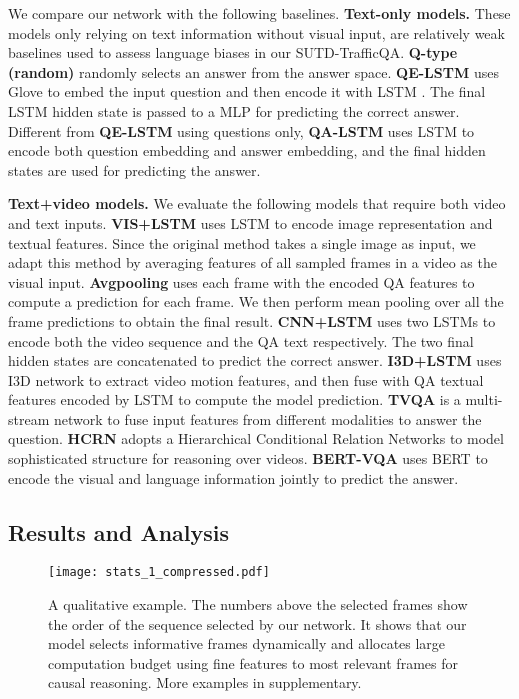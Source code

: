\documentclass[final]{cvpr}
\begin{document}
We compare our network with the following baselines.
{\bf Text-only models.} These models only relying on text information without visual input, are relatively weak baselines used to assess language biases in our SUTD-TrafficQA. {\bf Q-type (random)} randomly selects an answer from the answer space. {\bf QE-LSTM} uses Glove \cite{Pennington14glove:global} to embed the input question and then encode it with LSTM \cite{hochreiter1997long}. The final LSTM hidden state is passed to a MLP for predicting the correct answer. Different from {\bf QE-LSTM} using questions only, {\bf QA-LSTM} uses LSTM to encode both question embedding and answer embedding, and the final hidden states are used for predicting the answer.

{\bf Text+video models.} We evaluate the following models that require both video and text inputs. 
{\bf VIS+LSTM} \cite{ren2015exploring} uses LSTM to encode image representation and textual features. Since the original method takes a single image as input, we adapt this method by averaging features of all sampled frames in a video as the visual input. 
{\bf Avgpooling} uses each frame with the encoded QA features to compute a prediction for each frame.
We then perform mean pooling over all the frame predictions to obtain the final result. 
{\bf CNN+LSTM} uses two LSTMs to encode both the video sequence and the QA text respectively. The two final hidden states are concatenated to predict the correct answer.
{\bf I3D+LSTM} uses I3D network \cite{carreira2017quo} to extract video motion features, and then fuse with QA textual features encoded by LSTM to compute the model prediction.
{\bf TVQA} \cite{lei2018tvqa} is a multi-stream network to fuse input features from different modalities to answer the question. 
{\bf HCRN} \cite{Le_2020_CVPR} adopts a Hierarchical Conditional Relation Networks to model sophisticated structure for reasoning over videos.
{\bf BERT-VQA} \cite{Yang_2020_WACV} uses BERT \cite{devlin2018bert} 
to encode the visual and language information jointly to predict the answer. 
{\bf }




\subsection{Results and Analysis}

\begin{figure*}[t]
\setlength\abovecaptionskip{-5cm}
\setlength\belowcaptionskip{-5cm}
\begin{center}
    \texttt{[image: stats\_1\_compressed.pdf]}
\end{center}
\vspace{-0.3cm}
    \caption{A qualitative example. The numbers above the selected frames show the order of the sequence selected by our network. It shows that our model selects informative frames dynamically and allocates large computation budget using fine features to most relevant frames for causal reasoning. More examples in supplementary.}
\label{fig:policy_example}
\vspace{-0.3cm}
\end{figure*}
\end{document}
